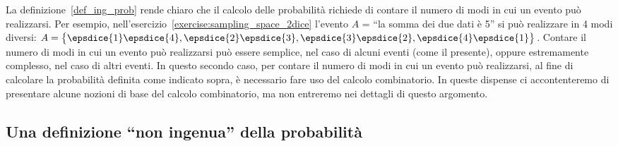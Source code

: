 La definizione~\ref{def_ing_prob} rende chiaro che il calcolo delle probabilità richiede di contare il numero di modi in cui un evento può realizzarsi.
Per esempio, nell'esercizio~\ref{exercise:sampling_space_2dice} l'evento $A$ = \enquote{la somma dei due dati è 5} si può realizzare in 4 modi diversi:
$
A = \big\{
\epsdice{1}\epsdice{4}, 
\epsdice{2}\epsdice{3}, 
\epsdice{3}\epsdice{2},
\epsdice{4}\epsdice{1}
\big\}
$. 
Contare il numero di modi in cui un evento può realizzarsi può essere semplice,  nel caso di alcuni eventi (come il presente), oppure estremamente complesso, nel caso di altri eventi.
In questo secondo caso, per contare il numero di modi in cui un evento può realizzarsi, al fine di calcolare la probabilità definita come indicato sopra, è necessario fare uso del calcolo combinatorio.
In queste dispense ci accontenteremo di presentare alcune nozioni di base del calcolo combinatorio, ma non entreremo nei dettagli di questo argomento.


\subsection{Una definizione \enquote{non ingenua} della probabilità}

